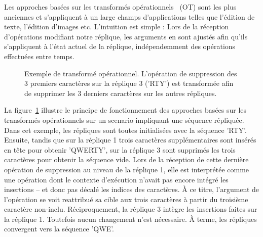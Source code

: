 Les approches basées sur les transformés opérationnels~\cite{sun1998operational,
  sun2009contextbased} (OT) sont les plus anciennes et s'appliquent à un large
champs d'applications telles que l'édition de texte, l'édition d'images
etc. L'intuition est simple : Lors de la réception d'opérations modifiant notre
réplique, les arguments en sont ajustés afin qu'ils s'appliquent à l'état actuel
de la réplique, indépendemment des opérations effectuées entre temps.

\begin{figure}
  \centering
  
  \caption{\label{repl:fig:otexample} Exemple de transformé
    opérationnel. L'opération de suppression des 3 premiers caractères sur la
    réplique 3 ('RTY') est transformée afin de supprimer les 3 derniers caractères
    sur les autres répliques.}
\end{figure}

La figure~\ref{repl:fig:otexample} illustre le principe de fonctionnement des
approches basées sur les transformés opérationnels sur un scenario impliquant
une séquence répliquée. Dans cet exemple, les répliques sont toutes initialisées
avec la séquence 'RTY'. Ensuite, tandis que sur la réplique 1 trois caractères
supplémentaires sont insérés en tête pour obtenir 'QWERTY', sur la réplique 3
sont supprimés les trois caractères pour obtenir la séquence vide. Lors de la
réception de cette dernière opération de suppression au niveau de la réplique 1,
elle est interprétée comme une opération dont le contexte d'exécution n'avait
pas encore intégré les insertions -- et donc pas décalé les indices des
caractères. À ce titre, l'argument de l'opération se voit reattribué sa cible
aux trois caractères à partir du troisième caractère non-inclu. Réciproquement,
la réplique 3 intègre les insertions faites sur la réplique 1. Toutefois aucun
changement n'est nécessaire. À terme, les répliques convergent vers la séquence
'QWE'.

